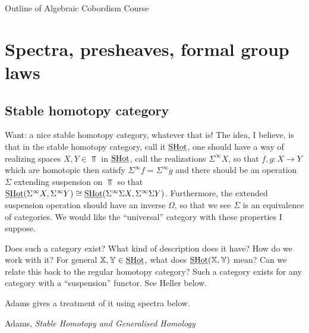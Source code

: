 \documentclass{article}%
\begin{document}
\begin{center}
{\Large \sc Outline of Algebraic Cobordism Course} 

\bigskip

\end{center}

\section{Spectra, presheaves, formal group laws}

\subsection{Stable homotopy category}
Want: a nice stable homotopy category, whatever that is! The idea, I
believe, is that in the stable homotopy category, call it $\operatorname{\underline{SHot}}$, one
should have a way of realizing spaces $X, Y \in \Top$ in $\operatorname{\underline{SHot}}$, call
the realizations $\Sigma^{\infty}X$, so that $f,g : X \rightarrow Y$
which are homotopic then satisfy $\Sigma^{\infty}f = \Sigma^{\infty}g$
and there should be an operation $\Sigma$ extending suspension on
$\Top$ so that $\operatorname{\underline{SHot}}(\Sigma^{\infty}X, \Sigma^{\infty}Y)\cong
\operatorname{\underline{SHot}}(\Sigma^{\infty}\Sigma X,\Sigma^{\infty}\Sigma Y)$. Furthermore,
the extended suspension operation should have an inverse $\Omega$, so
that we see $\Sigma$ is an equivalence of categories. We would like
the ``universal'' category with these properties I suppose.

Does such a category exist? What kind of description does it have? How
do we work with it?  For general $\mathbb{X},\mathbb{Y}\in\operatorname{\underline{SHot}}$, what does
$\operatorname{\underline{SHot}}(\mathbb{X},\mathbb{Y})$ mean?  Can we relate this back to the regular
homotopy category? Such a category exists for any category with a
``suspension'' functor. See Heller below. 

Adams gives a treatment of it using spectra below. 

Adams, {\it Stable Homotopy and Generalised Homology}
\end{document}
